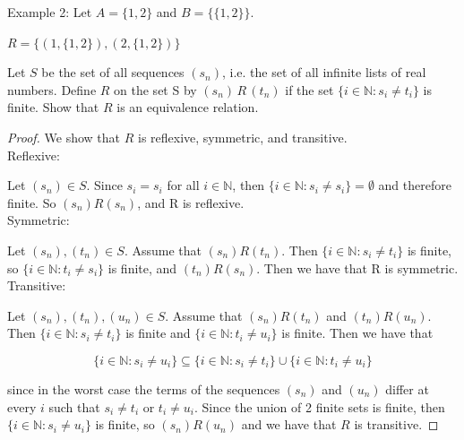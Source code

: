 \documentclass[12 pt]{exam}
\begin{document}
\begin{questions}
\begin{solution}
Example 2:
Let $A = \{1, 2\}$ and $B = \{\{1, 2\}\}$.

$R = \{(1, \{1, 2\}), (2, \{1, 2\})\}$
\end{solution}


\question Let $S$ be the set of all sequences $(s_n)$, i.e. the set of all infinite lists of real numbers. Define $R$ on the set S by $(s_n) \, R \, (t_n)$ if the set $\{i \in \mathbb{N} : s_i\neq t_i \}$ is finite. Show that $R$ is an equivalence relation. 

\begin{solution}\begin{proof}
We show that $R$ is reflexive, symmetric, and transitive.\\

Reflexive:

Let $(s_n) \in S$. Since $s_i = s_i$ for all $i \in \mathbb{N}$, then
$\{i \in \mathbb{N}: s_i \ne s_i\} = \emptyset$ and therefore finite. So $(s_n) R (s_n)$, and R is reflexive.\\

Symmetric:

Let $(s_n), (t_n) \in S$. Assume that $(s_n) R (t_n)$. Then $\{i \in \mathbb{N}: s_i \ne t_i\}$ is finite, so
$\{i \in \mathbb{N}: t_i \ne s_i\}$ is finite, and $(t_n) R (s_n)$. Then we have that R is symmetric.\\

Transitive:

Let $(s_n), (t_n), (u_n) \in S$. Assume that $(s_n) R (t_n)$ and $(t_n) R (u_n)$.
Then $\{i \in \mathbb{N}: s_i \ne t_i\}$ is finite and $\{i \in \mathbb{N}: t_i \ne u_i\}$ is finite.
Then we have that

$$\{i \in \mathbb{N}: s_i \ne u_i\} \subseteq
\{i \in \mathbb{N}: s_i \ne t_i\} \cup \{i \in \mathbb{N}: t_i \ne u_i\}$$

since in the worst case the terms of the sequences $(s_n)$ and $(u_n)$ differ at every $i$ such that
$s_i \ne t_i$ or $t_i \ne u_i$. Since the union of 2 finite sets is finite, then
$\{i \in \mathbb{N}: s_i \ne u_i\}$ is finite, so $(s_n) R (u_n)$ and we have that $R$ is transitive.


\end{proof}\end{solution}


\end{questions}
\end{document}
